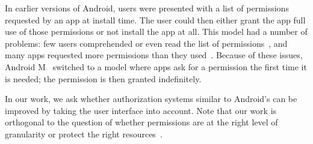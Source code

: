 In earlier versions of Android, users were presented
with a list of permissions requested by an app at install time. The
user could then either grant the app full use of those permissions or
not install the app at all. This model had a number of
problems: few users comprehended or even read the list of permissions~\cite{Felt:2012soups},
and many apps requested more permissions than they used~\cite{Felt:2011}. 
Because of these
issues, Android M~\cite{AndroidMPermissions} switched to a model where
apps ask for a permission the first time it is needed; the permission is 
then granted indefinitely.

In our work, we ask whether authorization systems similar to
Android's can be improved by taking the user interface into account.
Note that our work is orthogonal to the question of whether
permissions are at the right level of granularity
\cite{Jeon:spsm2012,Bugiel:2013} or protect the right
resources~\cite{Felt:2012spsm}.



